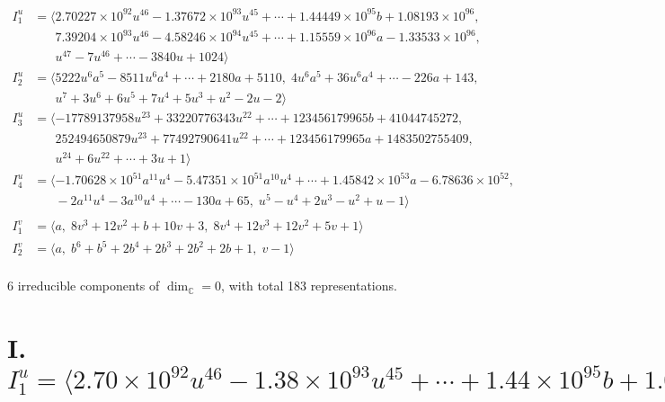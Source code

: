 \documentclass[1p]{elsarticle_modified}
\theoremstyle{definition}
\begin{document}
\begin{align*}
I^u_{1}&=\langle 
2.70227\times10^{92} u^{46}-1.37672\times10^{93} u^{45}+\cdots+1.44449\times10^{95} b+1.08193\times10^{96},\\
\phantom{I^u_{1}}&\phantom{= \langle  }7.39204\times10^{93} u^{46}-4.58246\times10^{94} u^{45}+\cdots+1.15559\times10^{96} a-1.33533\times10^{96},\\
\phantom{I^u_{1}}&\phantom{= \langle  }u^{47}-7 u^{46}+\cdots-3840 u+1024\rangle \\
I^u_{2}&=\langle 
5222 u^6 a^5-8511 u^6 a^4+\cdots+2180 a+5110,\;4 u^6 a^5+36 u^6 a^4+\cdots-226 a+143,\\
\phantom{I^u_{2}}&\phantom{= \langle  }u^7+3 u^6+6 u^5+7 u^4+5 u^3+u^2-2 u-2\rangle \\
I^u_{3}&=\langle 
-17789137958 u^{23}+33220776343 u^{22}+\cdots+123456179965 b+41044745272,\\
\phantom{I^u_{3}}&\phantom{= \langle  }252494650879 u^{23}+77492790641 u^{22}+\cdots+123456179965 a+1483502755409,\\
\phantom{I^u_{3}}&\phantom{= \langle  }u^{24}+6 u^{22}+\cdots+3 u+1\rangle \\
I^u_{4}&=\langle 
-1.70628\times10^{51} a^{11} u^{4}-5.47351\times10^{51} a^{10} u^{4}+\cdots+1.45842\times10^{53} a-6.78636\times10^{52},\\
\phantom{I^u_{4}}&\phantom{= \langle  }-2 a^{11} u^4-3 a^{10} u^4+\cdots-130 a+65,\;u^5- u^4+2 u^3- u^2+u-1\rangle \\
\\
I^v_{1}&=\langle 
a,\;8 v^3+12 v^2+b+10 v+3,\;8 v^4+12 v^3+12 v^2+5 v+1\rangle \\
I^v_{2}&=\langle 
a,\;b^6+b^5+2 b^4+2 b^3+2 b^2+2 b+1,\;v-1\rangle \\
\end{align*}
\raggedright * 6 irreducible components of $\dim_{\mathbb{C}}=0$, with total 183 representations.\\
\newpage
\renewcommand{\arraystretch}{1}
\centering \section*{I. $I^u_{1}= \langle 2.70\times10^{92} u^{46}-1.38\times10^{93} u^{45}+\cdots+1.44\times10^{95} b+1.08\times10^{96},\;7.39\times10^{93} u^{46}-4.58\times10^{94} u^{45}+\cdots+1.16\times10^{96} a-1.34\times10^{96},\;u^{47}-7 u^{46}+\cdots-3840 u+1024 \rangle$}
\end{document}
